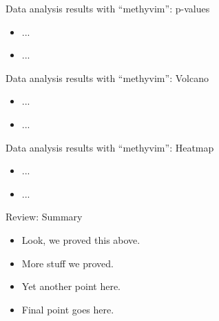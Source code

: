\documentclass[12pt,t]{beamer}
\begin{document}

\begin{frame}[c]{Data analysis results with ``methyvim'': p-values}

\begin{center}
\begin{itemize}
  \item ...
  \item ...
\end{itemize}
\end{center}

\note{
}

\end{frame}


\begin{frame}[c]{Data analysis results with ``methyvim'': Volcano}

\begin{center}
\begin{itemize}
  \item ...
  \item ...
\end{itemize}
\end{center}

\note{
}

\end{frame}


\begin{frame}[c]{Data analysis results with ``methyvim'': Heatmap}

\begin{center}
\begin{itemize}
  \item ...
  \item ...
\end{itemize}
\end{center}

\note{
}

\end{frame}


\begin{frame}[c]{Review: Summary}

\begin{center}
\begin{itemize}
  \itemsep12pt
  \item Look, we proved this above.
  \item More stuff we proved.
  \item Yet another point here.
  \item Final point goes here.
\end{itemize}
\end{center}


\end{frame}
\end{document}
